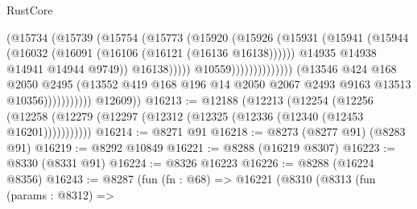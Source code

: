 \begin{lexlean}{RustCore}
\begin{coremodule}
                                                    (@15734
                                                      (@15739
                                                        (@15754
                                                          (@15773
                                                            (@15920
                                                              (@15926
                                                                (@15931
                                                                  (@15941
                                                                    (@15944
                                                                      (@16032
                                                                        (@16091
                                                                          (@16106
                                                                            (@16121
                                                                              (@16136 @16138))))))
                                                                    @14935
                                                                    @14938
                                                                    @14941
                                                                    @14944
                                                                    @9749))
                                                                @16138)))))
                                                      @10559))))))))))))))
                          (@13546
                            @424
                            @168
                            @2050
                            @2495
                            (@13552
                              @419
                              @168
                              @196
                              @14
                              @2050
                              @2067
                              @2493
                              @9163
                              @13513
                              @10356)))))))))))
        @12609))
@16213 := @12188
    (@12213
      (@12254
        (@12256 (@12258 (@12279 (@12297 (@12312 (@12325 (@12336 (@12340 (@12453 @16201)))))))))))
@16214 := @8271 @91
@16218 := @8273 (@8277 @91) (@8283 @91)
@16219 := @8292 @10849
@16221 := @8288 (@16219 @8307)
@16223 := @8330 (@8331 @91)
@16224 := @8326 @16223
@16226 := @8288 (@16224 @8356)
@16243 := @8287
    (fun (fn : @68) =>
    @16221
      (@8310
        (@8313
          (fun (params : @8312) =>

\end{coremodule}
\end{lexlean}
